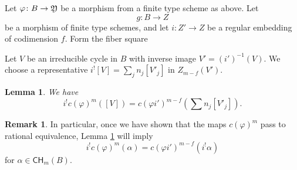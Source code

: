\documentclass[a4paper,12pt]{article} %
\theoremstyle{definition}
\newtheorem{remark}[definition]{Remark}
\theoremstyle{plain}%
\newtheorem{lemma}[definition]{Lemma}
\renewcommand{\phi}{\varphi}
\newcommand{\Chow}{\mathsf{CH}}
\begin{document}
Let $\phi\colon B \to \frak Y$ be a morphism from a finite type scheme
as above. Let $$g\colon B \to Z$$ be a morphism of finite type schemes, and let $i\colon Z' \to Z$ be a regular embedding of codimension $f$. 
Form the fiber square 
\begin{center}
\end{center} 
Let $V$ be an irreducible cycle in $B$ with inverse image $V' = (i')^{-1}(V)$. 
We choose a representative $i^![V] = \sum_j n_j [V'_j]$ in $Z_{m-f}(V')$. 
\begin{lemma}\label{lem:C3regimb}
We have 
\[i^! c(\phi)^m ([V]) = c(\phi i')^{m-f}\left(\sum n_j [V'_j]\right). \]
\end{lemma}
\begin{remark}
In particular, once we have shown that the maps $c(\phi)^m$ pass to rational equivalence, 
Lemma \ref{lem:C3regimb} will imply 
\[i^! c(\phi)^m(\alpha) = c(\phi i')^{m-f}(i^! \alpha) \]
for  $\alpha \in \Chow_m(B)$. 
\end{remark}
\end{document}
